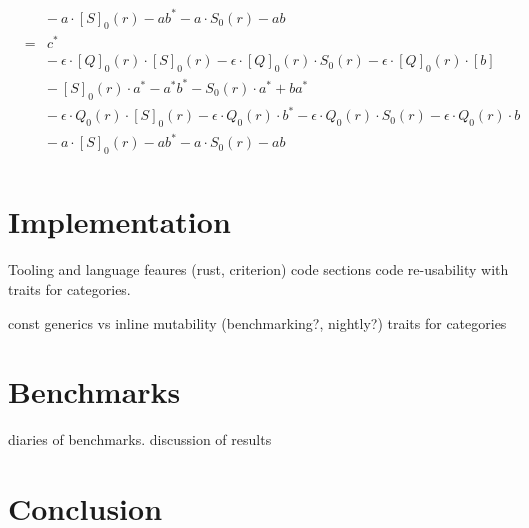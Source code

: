 \documentclass[twoside,11pt,openright]{report}
\begin{document}
\begin{align*}
               &   & -\ a \cdot {[S]}_0(r) -ab^* - a \cdot S_0(r) -ab                                                                                                  \\
               & = & c^*                                                                                                                                               \\
               &   & -\ \epsilon \cdot {[Q]}_0(r) \cdot {[S]}_0(r) - \epsilon \cdot {[Q]}_0(r) \cdot S_0(r) -  \epsilon \cdot {[Q]}_0(r) \cdot[b]                      \\
               &   & -\  {[S]}_0(r) \cdot a^* - a^*b^* - S_0(r) \cdot a^* + ba^*                                                                                       \\
               &   & -\  \epsilon \cdot Q_0(r) \cdot {[S]}_0(r) - \epsilon \cdot Q_0(r) \cdot b^* - \epsilon \cdot Q_0(r) \cdot S_0(r) - \epsilon \cdot Q_0(r) \cdot b \\
               &   & -\ a \cdot {[S]}_0(r) -ab^* - a \cdot S_0(r) -ab                                                                                                  \\
\end{align*}


\chapter{Implementation}
\label{ch:impl}

Tooling and language feaures (rust, criterion)
code sections
code re-usability with traits for categories.

const generics vs inline mutability (benchmarking?, nightly?)
traits for categories


\chapter{Benchmarks}
\label{ch:bench}
diaries of benchmarks.
discussion of results

\lipsum[1-20] %


\chapter{Conclusion}
\label{ch:conclusion}
\end{document}
